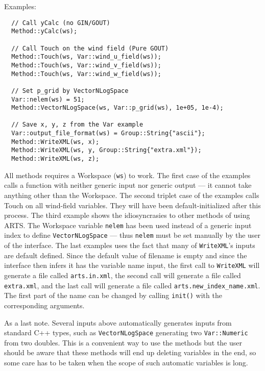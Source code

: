 Examples:
\begin{verbatim}
  // Call yCalc (no GIN/GOUT)
  Method::yCalc(ws);
  
  // Call Touch on the wind field (Pure GOUT)
  Method::Touch(ws, Var::wind_u_field(ws));
  Method::Touch(ws, Var::wind_v_field(ws));
  Method::Touch(ws, Var::wind_w_field(ws));
  
  // Set p_grid by VectorNLogSpace
  Var::nelem(ws) = 51;
  Method::VectorNLogSpace(ws, Var::p_grid(ws), 1e+05, 1e-4);
  
  // Save x, y, z from the Var example
  Var::output_file_format(ws) = Group::String{"ascii"};
  Method::WriteXML(ws, x);
  Method::WriteXML(ws, y, Group::String{"extra.xml"});
  Method::WriteXML(ws, z);
\end{verbatim}
All methods requires a Workspace (\verb|ws|) to work.
The first case of the examples calls a function with neither generic input nor generic output --- it cannot take anything other than the Workspace.
The second triplet case of the examples calls Touch on all wind-field variables.  They will have been default-initialized after this process.
The third example shows the idiosyncrasies to other methods of using ARTS.  The Workspace variable \verb|nelem| has been used instead of a generic
input index to define \verb|VectorNLogSpace| --- thus \verb|nelem| must be set manually by the user of the interface.
The last examples uses the fact that many of \verb|WriteXML|'s inputs are default defined.  Since the default value of filename is empty and since
the interface then infers it has the variable name input, the first call to \verb|WriteXML| will generate a file called \verb|arts.in.xml|, the second
call will generate a file called \verb|extra.xml|, and the last call will generate a file called \verb|arts.new_index_name.xml|.  The first part of
the name can be changed by calling \verb|init()| with the corresponding arguments.

As a last note.  Several inputs above automatically generates inputs from standard C++ types, such as \verb|VectorNLogSpace|
generating two \verb|Var::Numeric| from two doubles.  This is a convenient way to use the methods but the user should
be aware that these methods will end up deleting variables in the end, so some care has to be taken when the scope of such
automatic variables is long.

